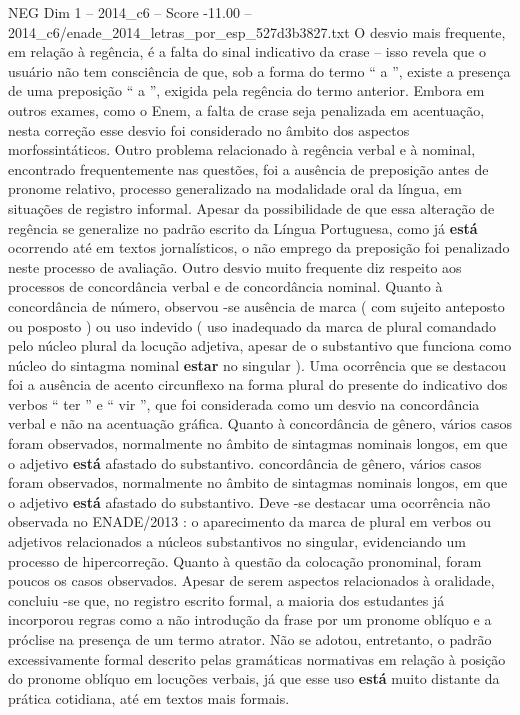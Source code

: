 \begin{textsample}{NEG Dim 1 – 2014\_c6 – Score -11.00 – 2014\_c6/enade\_2014\_letras\_por\_esp\_527d3b3827.txt}
O desvio mais frequente, em relação à regência, é a falta do sinal indicativo da crase – isso revela que o usuário não tem consciência de que, sob a forma do termo “ a ”, existe a presença de uma preposição “ a ”, exigida pela regência do termo anterior.
Embora em outros exames, como o Enem, a falta de crase seja penalizada em acentuação, nesta correção esse desvio foi considerado no âmbito dos aspectos morfossintáticos.
Outro problema relacionado à regência verbal e à nominal, encontrado frequentemente nas questões, foi a ausência de preposição antes de pronome relativo, processo generalizado na modalidade oral da língua, em situações de registro informal.
Apesar da possibilidade de que essa alteração de regência se generalize no padrão escrito da Língua Portuguesa, como já \textbf{está} ocorrendo até em textos jornalísticos, o não emprego da preposição foi penalizado neste processo de avaliação.
Outro desvio muito frequente diz respeito aos processos de concordância verbal e de concordância nominal.
Quanto à concordância de número, observou -se ausência de marca ( com sujeito anteposto ou posposto ) ou uso indevido ( uso inadequado da marca de plural comandado pelo núcleo plural da locução adjetiva, apesar de o substantivo que funciona como núcleo do sintagma nominal \textbf{estar} no singular ).
Uma ocorrência que se destacou foi a ausência de acento circunflexo na forma plural do presente do indicativo dos verbos “ ter ” e “ vir ”, que foi considerada como um desvio na concordância verbal e não na acentuação gráfica.
Quanto à concordância de gênero, vários casos foram observados, normalmente no âmbito de sintagmas nominais longos, em que o adjetivo \textbf{está} afastado do substantivo. concordância de gênero, vários casos foram observados, normalmente no âmbito de sintagmas nominais longos, em que o adjetivo \textbf{está} afastado do substantivo.
Deve -se destacar uma ocorrência não observada no ENADE/2013 : o aparecimento da marca de plural em verbos ou adjetivos relacionados a núcleos substantivos no singular, evidenciando um processo de hipercorreção.
Quanto à questão da colocação pronominal, foram poucos os casos observados.
Apesar de serem aspectos relacionados à oralidade, concluiu -se que, no registro escrito formal, a maioria dos estudantes já incorporou regras como a não introdução da frase por um pronome oblíquo e a próclise na presença de um termo atrator.
Não se adotou, entretanto, o padrão excessivamente formal descrito pelas gramáticas normativas em relação à posição do pronome oblíquo em locuções verbais, já que esse uso \textbf{está} muito distante da prática cotidiana, até em textos mais formais.

\end{textsample}
